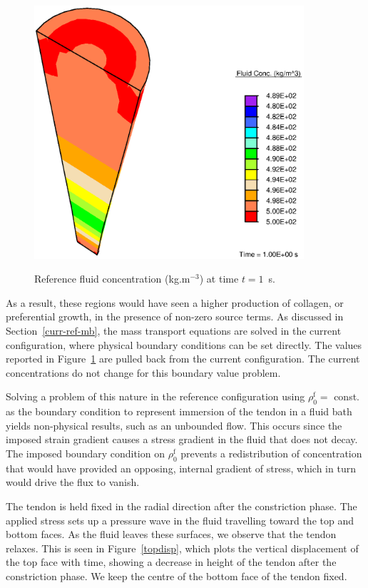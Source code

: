 \begin{figure}[ht]
  \centering
      {\includegraphics[width=10.00cm]{images/fluid-concentration.eps}}
      \caption{Reference fluid concentration (kg.m$^{-3}$) at time
      $t=1$~s.}
      \label{eg2conc}
\end{figure}

As a result, these regions would have seen a higher production of
collagen, or preferential growth, in the presence of non-zero source
terms. As discussed in Section~\ref{curr-ref-mb}, the mass transport
equations are solved in the current configuration, where physical
boundary conditions can be set directly. The values reported in
Figure~\ref{eg2conc} are pulled back from the current
configuration. The current concentrations do not change for this
boundary value problem. 

Solving a problem of this nature in the
reference configuration using $\rho_0^\mathrm{f} = $ const. as the
boundary condition to represent immersion of the tendon in a fluid bath
yields non-physical results, such as an unbounded flow. This occurs
since the imposed strain gradient causes a stress gradient in the
fluid that does not decay. The imposed boundary condition on $\rho_0^\mathrm{f}$
prevents a redistribution of concentration that would have provided an
opposing, internal gradient of stress, which in turn would drive the
flux to vanish.

The tendon is held fixed in the radial direction after the
constriction phase. The applied stress sets up a pressure wave in the
fluid travelling toward the top and bottom faces. As the fluid leaves
these surfaces, we observe that the tendon relaxes. This is seen in
Figure~\ref{topdisp}, which plots the vertical displacement of the top
face with time, showing a decrease in height of the tendon after the
constriction phase. We keep the centre of the bottom face of the
tendon fixed.


